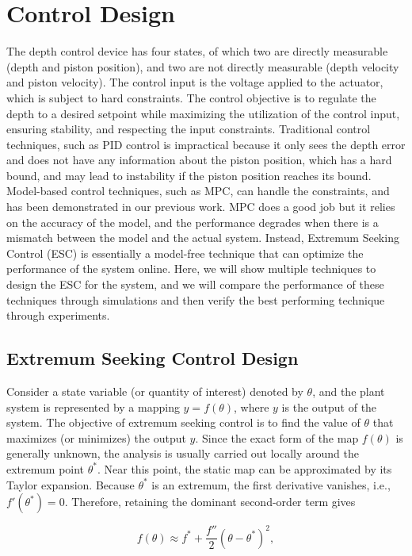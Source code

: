 ﻿\documentclass[subscriptcorrection,upint,varvw,barcolor=Goldenrod3,mathalfa=cal=euler,balance,hyphenate,french,pdf-a]{asmejour}
\begin{document}
\section{Control Design}
The depth control device has four states, of which two are directly measurable (depth and piston position), and two are not directly measurable (depth velocity and piston velocity). The control input is the voltage applied to the actuator, which is subject to hard constraints. The control objective is to regulate the depth to a desired setpoint while maximizing the utilization of the control input, ensuring stability, and respecting the input constraints. Traditional control techniques, such as PID control is impractical because it only sees the depth error and does not have any information about the piston position, which has a hard bound, and may lead to instability if the piston position reaches its bound. Model-based control techniques, such as MPC, can handle the constraints, and has been demonstrated in our previous work. MPC does a good job but it relies on the accuracy of the model, and the performance degrades when there is a mismatch between the model and the actual system. Instead, Extremum Seeking Control (ESC) is essentially a model-free technique that can optimize the performance of the system online. Here, we will show multiple techniques to design the ESC for the system, and we will compare the performance of these techniques through simulations and then verify the best performing technique through experiments.

\subsection{Extremum Seeking Control Design}
Consider a state variable (or quantity of interest) denoted by $\theta$, and the plant system is represented by a mapping $y = f(\theta)$, where $y$ is the output of the system. The objective of extremum seeking control is to find the value of $\theta$ that maximizes (or minimizes) the output $y$. 
Since the exact form of the map $f(\theta)$ is generally unknown, the analysis is usually carried out locally around the extremum point $\theta^\ast$. Near this point, the static map can be approximated by its Taylor expansion. Because $\theta^\ast$ is an extremum, the first derivative vanishes, i.e., $f'(\theta^\ast)=0$. Therefore, retaining the dominant second-order term gives

\begin{equation}
f(\theta)
\approx
f^\ast
+
\frac{f''}{2}
\left(\theta-\theta^\ast\right)^2,
\label{eq:static_map_quadratic}
\end{equation}
\end{document}
